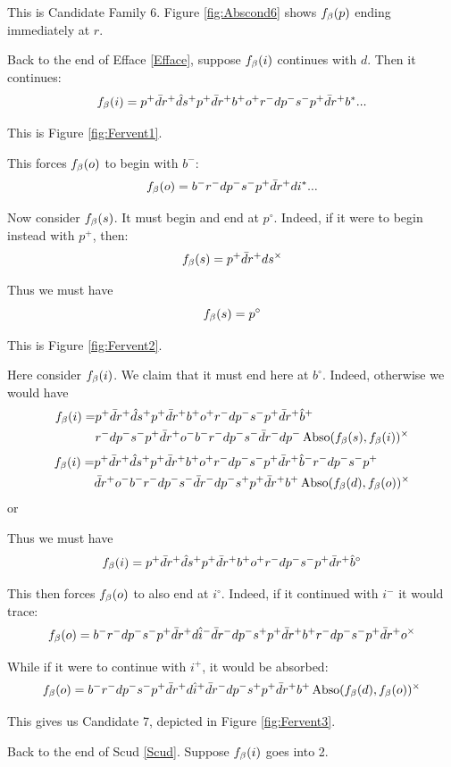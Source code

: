 This is Candidate Family 6. Figure \ref{fig:Abscond6} shows $f_\beta(p)$ ending immediately at $r$.


\label{Fervent}
Back to the end of Efface \ref{Efface}, suppose $f_\beta(i)$ continues with $d$. Then it continues:
\[
f_\beta(i) = p^+ \bar{d} r^+ \hat{d} s^+ p^+ \bar{d} r^+ b^+ o^+ r^- d p^- s^- p^+ \bar{d} r^+ b^*...
\]

This is Figure \ref{fig:Fervent1}.

This forces $f_\beta(o)$ to begin with $b^-$:
\[
f_\beta(o) = b^- r^- d p^- s^- p^+ \bar{d} r^+ d i^*...
\]

Now consider $f_\beta(s)$. It must begin and end at $p^\circ$. Indeed, if it were to begin instead with $p^+$, then:
\[
f_\beta(s) = p^+ \bar{d} r^+ d s^\times
\]

Thus we must have
\[
f_\beta(s) = p^\circ
\]

This is Figure \ref{fig:Fervent2}.

Here consider $f_\beta(i)$. We claim that it must end here at $b^\circ$. Indeed, otherwise we would have
\begin{align*}
    f_\beta(i) = &p^+ \bar{d} r^+ \hat{d} s^+ p^+ \bar{d} r^+ b^+ o^+ r^- d p^- s^- p^+ \bar{d} r^+ \hat{b}^+\\
    & r^- d p^- s^- p^+ \bar{d} r^+ o^- b^- r^- d p^- s^- \bar{d} r^- d p^- \operatorname{Abso}(f_\beta(s), f_\beta(i))^\times
\end{align*}
\begin{align*}
    f_\beta(i) =& p^+ \bar{d} r^+ \hat{d} s^+ p^+ \bar{d} r^+ b^+ o^+ r^- d p^- s^- p^+ \bar{d} r^+ \hat{b}^- r^- d p^- s^- p^+\\
    &\bar{d} r^+ o^- b^- r^- d p^- s^- \bar{d} r^- d p^- s^+ p^+\bar{d} r^+ b^+ \operatorname{Abso}(f_\beta(d), f_\beta(o))^\times
\end{align*}
or

Thus we must have
\[
f_\beta(i) = p^+ \bar{d} r^+ \hat{d} s^+ p^+ \bar{d} r^+ b^+ o^+ r^- d p^- s^- p^+ \bar{d} r^+ \hat{b}^\circ
\]

This then forces $f_\beta(o)$ to also end at $i^\circ$. Indeed, if it continued with $i^-$ it would trace:
\[
f_\beta(o) = b^- r^- d p^- s^- p^+ \bar{d} r^+ d \hat{i}^- \bar{d} r^- d p^- s^+ p^+ \bar{d} r^+ b^+ r^- d p^- s^- p^+ \bar{d} r^+ o^\times
\]

While if it were to continue with $i^+$, it would be absorbed:
\[
f_\beta(o) = b^- r^- d p^- s^- p^+ \bar{d} r^+ d \hat{i}^+ \bar{d} r^- d p^- s^+ p^+ \bar{d} r^+ b^+ \operatorname{Abso}(f_\beta(d), f_\beta(o))^\times
\]

This gives us Candidate 7, depicted in Figure \ref{fig:Fervent3}.

 \label{Ombre}
Back to the end of Scud \ref{Scud}. Suppose $f_\beta(i)$ goes into 2. 

